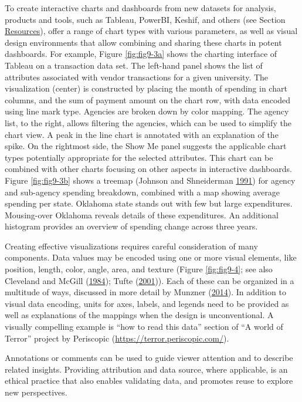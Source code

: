 \documentclass[]{krantz}
\begin{document}
To create interactive charts and dashboards from new datasets for
analysis, products and tools, such as Tableau, PowerBI, Keshif, and
others (see Section \protect\hyperlink{sec:viz-6}{Resources}), offer a
range of chart types with various parameters, as well as visual design
environments that allow combining and sharing these charts in potent
dashboards. For example, Figure \ref{fig:fig9-3a} shows the charting
interface of Tableau on a transaction data set. The left-hand panel
shows the list of attributes associated with vendor transactions for a
given university. The visualization (center) is constructed by placing
the month of spending in chart columns, and the sum of payment amount on
the chart row, with data encoded using line mark type. Agencies are
broken down by color mapping. The agency list, to the right, allows
filtering the agencies, which can be used to simplify the chart view. A
peak in the line chart is annotated with an explanation of the spike. On
the rightmost side, the Show Me panel suggests the applicable chart
types potentially appropriate for the selected attributes. This chart
can be combined with other charts focusing on other aspects in
interactive dashboards. Figure \ref{fig:fig9-3b} shows a treemap
(Johnson and Shneiderman \protect\hyperlink{ref-johnson1991tree}{1991})
for agency and sub-agency spending breakdown, combined with a map
showing average spending per state. Oklahoma state stands out with few
but large expenditures. Mousing-over Oklahoma reveals details of these
expenditures. An additional histogram provides an overview of spending
change across three years.

Creating effective visualizations requires careful consideration of many
components. Data values may be encoded using one or more visual
elements, like position, length, color, angle, area, and texture (Figure
\ref{fig:fig9-4}; see also Cleveland and McGill
(\protect\hyperlink{ref-cleveland1984graphical}{1984}); Tufte
(\protect\hyperlink{ref-edward2001visual}{2001})). Each of these can be
organized in a multitude of ways, discussed in more detail by Munzner
(\protect\hyperlink{ref-munzner2014visualization}{2014}). In addition to
visual data encoding, units for axes, labels, and legends need to be
provided as well as explanations of the mappings when the design is
unconventional. A visually compelling example is ``how to read this
data'' section of ``A world of Terror'' project by Periscopic
(\url{https://terror.periscopic.com/}).

Annotations or comments can be used to guide viewer attention and to
describe related insights. Providing attribution and data source, where
applicable, is an ethical practice that also enables validating data,
and promotes reuse to explore new perspectives.
\end{document}
